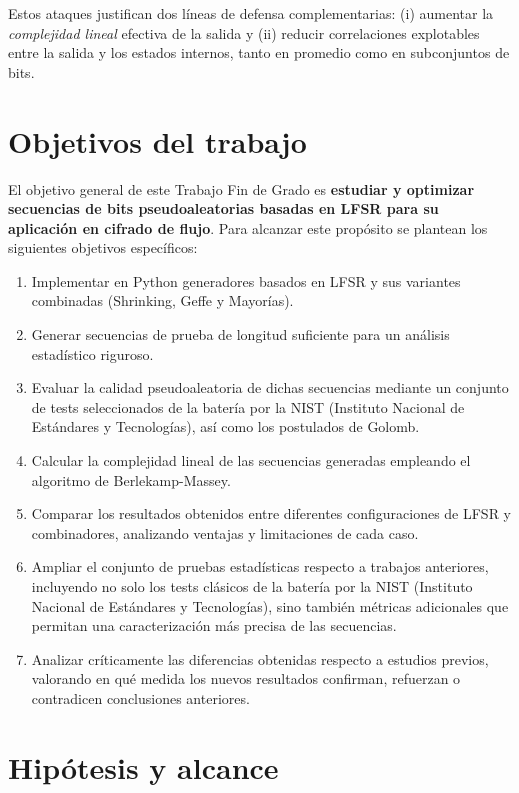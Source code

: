 Estos ataques justifican dos líneas de defensa complementarias: (i) aumentar la
\emph{complejidad lineal} efectiva de la salida y (ii) reducir correlaciones
explotables entre la salida y los estados internos, tanto en promedio como en
subconjuntos de bits.


\section*{Objetivos del trabajo}

El objetivo general de este Trabajo Fin de Grado es \textbf{estudiar y optimizar
secuencias de bits pseudoaleatorias basadas en LFSR para su aplicación en
cifrado de flujo}. Para alcanzar este propósito se plantean los siguientes
objetivos específicos:

\begin{enumerate}
    \item Implementar en Python generadores basados en LFSR y sus variantes
        combinadas (Shrinking, Geffe y Mayorías).
    \item Generar secuencias de prueba de longitud suficiente para un análisis
        estadístico riguroso.
    \item Evaluar la calidad pseudoaleatoria de dichas secuencias mediante un
        conjunto de tests seleccionados de la batería por la NIST (Instituto
        Nacional de Estándares y Tecnologías), así como los postulados de Golomb.
    \item Calcular la complejidad lineal de las secuencias generadas empleando
        el algoritmo de Berlekamp-Massey.
    \item Comparar los resultados obtenidos entre diferentes configuraciones de
        LFSR y combinadores, analizando ventajas y limitaciones de cada caso.
    \item Ampliar el conjunto de pruebas estadísticas respecto a trabajos anteriores,
        incluyendo no solo los tests clásicos de la batería por la NIST (Instituto
        Nacional de Estándares y Tecnologías), sino también métricas adicionales
        que permitan una caracterización más precisa de las secuencias.
    \item Analizar críticamente las diferencias obtenidas respecto a estudios previos,
        valorando en qué medida los nuevos resultados confirman, refuerzan o
        contradicen conclusiones anteriores.

\end{enumerate}

\section*{Hipótesis y alcance}

